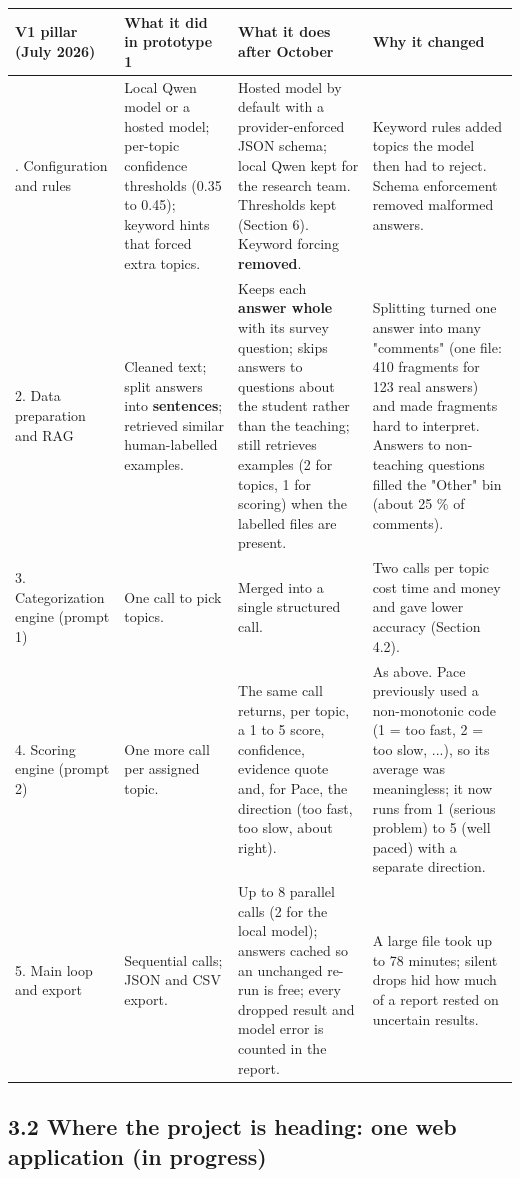 \documentclass[
  11pt,
]{article}
\newcounter{none} %
\begin{document}
{\def\LTcaptype{none} %
\begin{longtable}[]{@{}llll@{}}
\toprule\noalign{}
V1 pillar (July 2026) & What it did in prototype 1 & What it does after October
& Why it changed \\
\midrule\noalign{}
\endhead
\bottomrule\noalign{}
\endlastfoot
1. Configuration and rules & Local Qwen model or a hosted model; per-topic
confidence thresholds (0.35 to 0.45); keyword hints that forced extra topics. &
Hosted model by default with a provider-enforced JSON schema; local Qwen kept
for the research team. Thresholds kept (Section 6). Keyword forcing
\textbf{removed}. & Keyword rules added topics the model then had to reject.
Schema enforcement removed malformed answers. \\
2. Data preparation and RAG & Cleaned text; split answers into
\textbf{sentences}; retrieved similar human-labelled examples. & Keeps each
\textbf{answer whole} with its survey question; skips answers to questions about
the student rather than the teaching; still retrieves examples (2 for topics, 1
for scoring) when the labelled files are present. & Splitting turned one answer
into many "comments" (one file: 410 fragments for 123 real answers) and made
fragments hard to interpret. Answers to non-teaching questions filled the
"Other" bin (about 25 \% of comments). \\
3. Categorization engine (prompt 1) & One call to pick topics. & Merged into a
single structured call. & Two calls per topic cost time and money and gave lower
accuracy (Section 4.2). \\
4. Scoring engine (prompt 2) & One more call per assigned topic. & The same call
returns, per topic, a 1 to 5 score, confidence, evidence quote and, for Pace,
the direction (too fast, too slow, about right). & As above. Pace previously
used a non-monotonic code (1 = too fast, 2 = too slow, ...), so its average was
meaningless; it now runs from 1 (serious problem) to 5 (well paced) with a
separate direction. \\
5. Main loop and export & Sequential calls; JSON and CSV export. & Up to 8
parallel calls (2 for the local model); answers cached so an unchanged re-run is
free; every dropped result and model error is counted in the report. & A large
file took up to 78 minutes; silent drops hid how much of a report rested on
uncertain results. \\
\end{longtable}
}

\subsection{3.2 Where the project is heading: one web application (in
progress)}\label{32-where-the-project-is-heading-one-web-application-in-progress}
\end{document}
